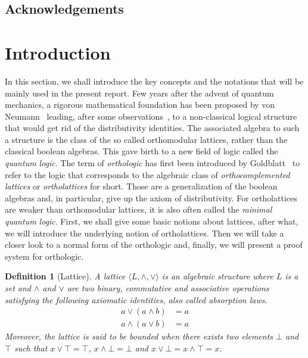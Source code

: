 \documentclass[a4paper, 11pt]{article}
\newtheorem{definition}[theorem]{Definition}
\begin{document}

	\subsection*{Acknowledgements}

	\newpage
    \section{Introduction}
    In this section, we shall introduce the key concepts and the notations that will be mainly used in
    the present report. Few years after the advent of quantum mechanics, a rigorous mathematical 
    foundation has been proposed by von Neumann~\cite{30573279-e8ec-3f1e-b0ba-eaf73275f821} leading, 
    after some 
    observations~\cite{2c73be7a-3de4-3824-8e11-49ebe4b183e4}, to a 
    non-classical logical structure that would get rid of the distributivity identities. 
    The associated algebra to such a structure is the class of the so
    called orthomodular lattices, rather than the classical boolean algebras. This gave birth to a new
    field of logic called the \textit{quantum logic}. The term of \textit{orthologic} has first been 
    introduced
    by Goldblatt~\cite{865e9aad-6de2-3b16-9861-412a9b18e683} to refer to the logic that corresponds to
    the algebraic class of \textit{orthocomplemented lattices} or \textit{ortholattices} for short.
    Those are a generalization of the boolean algebras and, in particular, give up the axiom of 
    distributivity. For ortholattices are weaker than orthomodular lattices, it is also
    often called the \textit{minimal quantum logic}. 
    First, we shall give some basic notions about lattices, after what, we will introduce the underlying 
    notion of ortholattices. Then we will take a closer look to
    a normal form of the orthologic and, finally, we will present a proof system for orthologic.
    \begin{definition}[Lattice]
	    A lattice $\langle L,\wedge,\vee\rangle$ is an algebraic structure where $L$ is a set and 
	    $\wedge$ and $\vee$ are two binary, commutative and associative operations satisfying the
	    following axiomatic identities, also called \textit{absorption laws}.
	    \begin{align*}
		    a\vee(a\wedge b)&=a\\
		    a\wedge(a\vee b)&=a
	    \end{align*}
	    Moreover, the lattice is said to be bounded when there exists two elements $\bot$ and $\top$
	    such that $x\vee\top=\top$, $x\wedge\bot=\bot$ and $x\vee\bot=x\wedge\top=x$.
    \end{definition}
\end{document}
